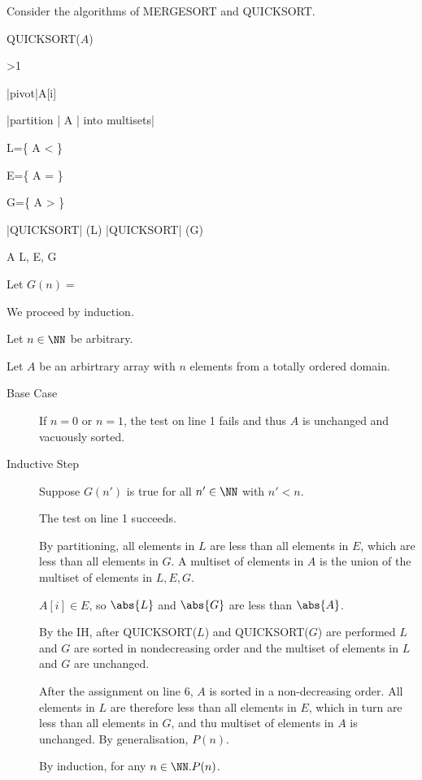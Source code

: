 \documentclass[11pt]{scrartcl}
\begin{document}
Consider the algorithms of MERGESORT and QUICKSORT.

QUICKSORT($A$)
\begin{program}
  \IF {}>1 \THEN 

  |pivot|\gets A[i]

  |partition | A | into multisets| 

  L=\{ A < \}

  E=\{ A = \}

  G=\{ A > \}

  |QUICKSORT| (L)
  |QUICKSORT| (G)

  A \gets L, E, G 

  \FI 

\end{program}

Let $G(n)=$

We proceed by induction.

Let $n\in\NN$ be arbitrary. 

Let $A$ be an arbirtrary array with $n$ elements from a totally ordered domain.

\begin{description}
\item[Base Case] \hfill

  If $n=0$ or $n=1$, the test on line 1 fails and thus $A$ is
  unchanged and vacuously sorted. 
\item[Inductive Step] \hfill

Suppose $G(n')$ is true for all $n'\in \NN$ with $n'< n$.

The test on line 1 succeeds.

By partitioning, all elements in $L$ are less than all elements in $E$, which are less than all elements in $G$. A multiset of elements in $A$ is the union of the multiset of elements in $L, E, G$.

$A[i]\in E$, so $\abs{L}$ and $\abs{G}$ are less than $\abs{A}$.

By the IH, after QUICKSORT($L$) and QUICKSORT($G$) are performed $L$ and $G$ are  sorted in nondecreasing order and the multiset of elements in $L$ and $G$ are unchanged.

After the assignment on line 6, $A$ is sorted in a non-decreasing order. All elements in $L$ are therefore less than all elements in $E$, which in turn are less than all elements in $G$, and thu multiset of elements in $A$ is unchanged. By generalisation, $P(n)$.

By induction, for any $n\in\NN.P(n)$.
\end{description}
\end{document}
